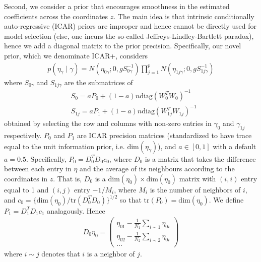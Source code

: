 Second, we consider a prior that encourages smoothness in the estimated coefficients across the coordinates $z$.
The main idea is that intrinsic conditionally auto-regressive (ICAR) priors are improper and hence cannot be directly used for model selection (else, one incurs the so-called Jeffreys-Lindley-Bartlett paradox), hence we add a diagonal matrix to the prior precision.
Specifically, our novel prior, which we denominate ICAR+, considers
\begin{align}
p(\eta_\gamma \mid \gamma)=
N\left(\eta_{0\gamma}; 0, g S_{0\gamma}^{-1}   \right)
\prod_{j=1}^p N\left(\eta_{1j\gamma}; 0, g S_{1j\gamma}^{-1}   \right)
\nonumber
\end{align}
where $S_{0\gamma}$ and  $S_{1j\gamma}$ are the submatrices of
\begin{align}
&S_0= a P_0 + (1-a) n \mbox{diag}(W_0^T W_0)^{-1}
\nonumber \\
&S_{1j}= a P_1 + (1-a) n \mbox{diag}(W_{1j}^T W_{1j})^{-1}
\nonumber
\end{align}
obtained by selecting the row and columns with non-zero entries in $\gamma_0$ and $\gamma_{1j}$ respectively.
$P_0$ and $P_1$ are ICAR precision matrices (standardized to have trace equal to the unit information prior, i.e. $\mbox{dim}(\eta_{\gamma})$), and $a \in [0,1]$ with a default $a=0.5$.
Specifically, $P_0= D_0^T D_0 c_0$, where $D_0$ is a matrix that takes the difference between each entry in $\eta$ and the average of its neighbours according to the coordinates in $z$.
That is, $D_0$ is a $\mbox{dim}(\eta_0) \times \mbox{dim}(\eta_0)$ matrix with $(i,i)$ entry equal to 1 and $(i,j)$ entry $-1/M_i$, where $M_i$ is the number of neighbors of $i$, and $c_0= \{\mbox{dim}(\eta_0) / \mbox{tr}(D_0^TD_0)\}^{1/2}$ so that $\mbox{tr}(P_0)=\mbox{dim}(\eta_0)$. We define $P_1= D_1^T D_1 c_1$ analagously. Hence
\begin{align}
D_0 \eta_0= \begin{pmatrix} 
\eta_{01} - \frac{1}{N_1} \sum_{i \sim 1} \eta_{0i}   \\
\eta_{02} - \frac{1}{N_2} \sum_{i \sim 2} \eta_{0i}   \\
\ldots
\end{pmatrix}
\nonumber
\end{align}
where $i \sim j$ denotes that $i$ is a neighbor of $j$.
